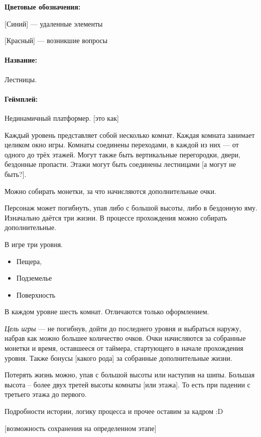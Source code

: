 \documentclass[12pt,a4paper]{article}
\begin{document}
\textbf{Цветовые обозначения:}

{\color{blue} [Синий]} --- удаленные элементы

{\color{red} [Красный]} --- возникшие вопросы

\paragraph{Название:} Лестницы.
\paragraph{Геймплей:} Нединамичный платформер. {\color{red} [это как]}

Каждый уровень представляет собой несколько комнат. Каждая комната занимает целиком окно игры. Комнаты соединены переходами, в каждой из них --- от одного до трёх этажей. Могут также быть вертикальные перегородки, двери, бездонные пропасти. Этажи могут быть соединены лестницами {\color{red} [а могут не быть?]}. 

Можно собирать монетки, за что начисляются дополнительные очки. 

Персонаж может погибнуть, упав либо с большой высоты, либо в бездонную яму. Изначально даётся три жизни. В процессе прохождения можно собирать дополнительные.

В игре три уровня.
\begin{itemize}
\item Пещера,
\item Подземелье
\item Поверхность
\end{itemize}

В каждом уровне шесть комнат. Отличаются только оформлением. 

\textit{Цель игры} --- не погибнув, дойти до последнего уровня и выбраться наружу, набрав как можно большее количество очков. Очки начисляются за собранные монетки и время, оставшееся от таймера, стартующего в начале прохождения уровня. Также бонусы {\color{red} [какого рода]} за собранные дополнительные жизни.

Потерять жизнь можно, упав с большой высоты или наступив на шипы. Большая высота -- более двух третей высоты комнаты {\color{red} [или этажа]}. То есть при падении с третьего этажа до первого.

Подробности истории, логику процесса и прочее оставим за кадром :D

{\color{red} [возможность сохранения на определенном этапе]}
\end{document}
